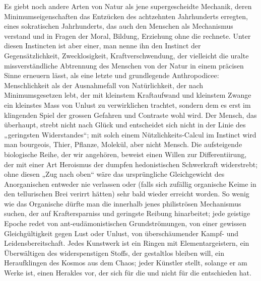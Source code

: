 Es giebt noch andere Arten von Natur als jene supergescheidte Mechanik, deren Minimumseigenschaften das Entzücken des achtzehnten Jahrhunderts erregten, eines sokratischen Jahrhunderts, das auch den Menschen als Mechanismus verstand und in Fragen der Moral, Bildung, Erziehung ohne die  rechnete. Unter diesen Instincten ist aber einer, man nenne ihn den Instinct der Gegensätzlichkeit, Zwecklosigkeit, Kraftverschwendung, der vielleicht die uralte missverständliche Abtrennung des Menschen von der Natur in einem präcisen Sinne erneuern lässt, als eine letzte und grundlegende Anthropodicee: Menschlichkeit als der Ausnahmefall von Natürlichkeit, der  nach Minimumsgesetzen lebt, der  mit kleinstem Kraftaufwand und kleinstem Zwange ein kleinstes Mass von Unlust zu verwirklichen trachtet, sondern dem es erst im klingenden Spiel der grossen Gefahren und Contraste wohl wird. Der Mensch, das  überhaupt, strebt nicht nach Glück und entscheidet sich nicht in der Linie des „geringsten Widerstandes“; mit solch einem Nützlichkeits-Calcul im Instinct wird man bourgeois, Thier, Pflanze, Molekül, aber nicht Mensch. Die aufsteigende biologische Reihe, der wir angehören, beweist einen Willen zur Differentiirung, der mit einer Art Heroismus der dumpfen hedonistischen Schwerkraft widerstrebt; ohne diesen „Zug nach oben“ wäre das ursprüngliche Gleichgewicht des Anorganischen entweder nie verlassen oder (falls sich zufällig organische Keime in den tellurischen Brei verirrt hätten) sehr bald wieder erreicht worden. So wenig wie das Organische dürfte man die  innerhalb jenes philiströsen Mechanismus suchen, der auf Kraftersparniss und geringste Reibung hinarbeitet; jede geistige Epoche redet von ant-eudämonistischen Grundströmungen, von einer gewissen Gleichgültigkeit gegen Lust oder Unlust, von überschäumender Kampf- und Leidensbereitschaft. Jedes Kunstwerk ist ein Ringen mit Elementargeistern, ein Überwältigen des widerspenstigen Stoffs, der gestaltlos bleiben will, ein Heraufklingen des Kosmos aus dem Chaos; jeder Künstler stellt, solange er am Werke ist, einen Herakles vor, der sich für die  und nicht für die  entschieden hat.
\par

